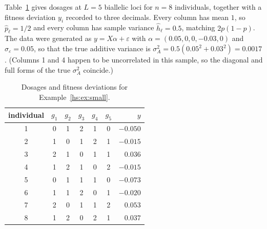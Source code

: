 \begin{example}
\label{hs:ex:small}
Table~\ref{hs:tab:small} gives dosages at $L = 5$ biallelic loci for $n = 8$ individuals, together with a fitness deviation $y_i$ recorded to three decimals. Every column has mean $1$, so $\hat p_\ell = 1/2$ and every column has sample variance $\hat h_\ell = 0.5$, matching $2p(1-p)$. The data were generated as $y = X\alpha + \varepsilon$ with $\alpha = (0.05, 0, 0, -0.03, 0)$ and $\sigma_\varepsilon = 0.05$, so that the true additive variance is $\sigma^2_A = 0.5(0.05^2 + 0.03^2) = 0.0017$. (Columns 1 and 4 happen to be uncorrelated in this sample, so the diagonal and full forms of the true $\sigma^2_A$ coincide.)

\begin{table}[t]
\centering
\small
\begin{tabular}{@{}c ccccc r@{}}
\toprule
individual & $g_1$ & $g_2$ & $g_3$ & $g_4$ & $g_5$ & $y$ \\
\midrule
1 & 0 & 1 & 2 & 1 & 0 & $-0.050$ \\
2 & 1 & 0 & 1 & 2 & 1 & $-0.015$ \\
3 & 2 & 1 & 0 & 1 & 1 & $0.036$ \\
4 & 1 & 2 & 1 & 0 & 2 & $-0.015$ \\
5 & 0 & 1 & 1 & 1 & 0 & $-0.073$ \\
6 & 1 & 1 & 2 & 0 & 1 & $-0.020$ \\
7 & 2 & 0 & 1 & 1 & 2 & $0.053$ \\
8 & 1 & 2 & 0 & 2 & 1 & $0.037$ \\
\bottomrule
\end{tabular}
\caption{Dosages and fitness deviations for Example~\ref{hs:ex:small}.}
\label{hs:tab:small}
\end{table}


\end{example}
